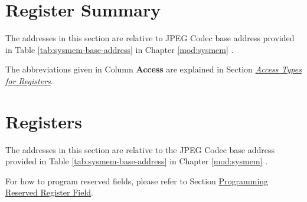 \documentclass[main\_\_EN.tex]{subfiles}
\begin{document}



\newpage
\hypertarget{jpegcodec-reg-summ}{}
\section{Register Summary}
\label{sec:jpegcodec-reg-summ}

The addresses in this section are relative to JPEG Codec base address provided in Table \ref{tab:sysmem-base-address} in Chapter \ref{mod:sysmem} \textit{}.

The abbreviations given in Column \textbf{Access} are explained in Section \hyperref[glossary-access-types]{\textit{Access Types for Registers}}.






\newpage

\section{Registers}

The addresses in this section are relative to the JPEG Codec base address provided in Table \ref{tab:sysmem-base-address} in Chapter \ref{mod:sysmem} \textit{}.

For how to program reserved fields, please refer to Section \hyperref[programming-reserved-field]{Programming Reserved Register Field}.


\end{document}
